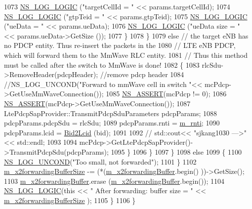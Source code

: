 \begin{DoxyCode}
1073             \hyperlink{group__logging_ga88acd260151caf2db9c0fc84997f45ce}{NS\_LOG\_LOGIC} (\textcolor{stringliteral}{"targetCellId = "} << params.targetCellId);
1074             \hyperlink{group__logging_ga88acd260151caf2db9c0fc84997f45ce}{NS\_LOG\_LOGIC} (\textcolor{stringliteral}{"gtpTeid = "} << params.gtpTeid);
1075             \hyperlink{group__logging_ga88acd260151caf2db9c0fc84997f45ce}{NS\_LOG\_LOGIC} (\textcolor{stringliteral}{"ueData = "} << params.ueData);
1076             \hyperlink{group__logging_ga88acd260151caf2db9c0fc84997f45ce}{NS\_LOG\_LOGIC} (\textcolor{stringliteral}{"ueData size = "} << params.ueData->GetSize ());
1077           \}
1078         \}
1079         \textcolor{keywordflow}{else} \textcolor{comment}{// the target eNB has no PDCP entity. Thus re-insert the packets in the }
1080         \textcolor{comment}{// LTE eNB PDCP, which will forward them to the MmWave RLC entity. }
1081         \textcolor{comment}{// Thus this method must be called after the switch to MmWave is done!}
1082         \{
1083           rlcSdu->RemoveHeader(pdcpHeader); \textcolor{comment}{//remove pdcp header}
1084           \textcolor{comment}{//NS\_LOG\_UNCOND("Forward to mmWave cell in switch  "<< mcPdcp->GetUseMmWaveConnection());}
1085           \hyperlink{assert_8h_a6dccdb0de9b252f60088ce281c49d052}{NS\_ASSERT}(mcPdcp != 0);
1086           \hyperlink{assert_8h_a6dccdb0de9b252f60088ce281c49d052}{NS\_ASSERT}(mcPdcp->GetUseMmWaveConnection());
1087           LtePdcpSapProvider::TransmitPdcpSduParameters pdcpParams;
1088           pdcpParams.pdcpSdu = rlcSdu;
1089           pdcpParams.rnti = \hyperlink{classns3_1_1UeManager_a5a72b4fe818f21993bd7f05d7e2c4f83}{m\_rnti};
1090           pdcpParams.lcid = \hyperlink{classns3_1_1UeManager_a5f3f8e891803bc57dc35af2c6c5a286d}{Bid2Lcid} (bid);
1091 
1092     \textcolor{comment}{//      std::cout<< "sjkang1030 --->" << std::endl;}
1093 
1094           mcPdcp->GetLtePdcpSapProvider()->TransmitPdcpSdu(pdcpParams);
1095         \}
1096       \}
1097     \}
1098     \textcolor{keywordflow}{else}
1099     \{
1100       \hyperlink{log-macros-disabled_8h_a0b36e5e182b37194f85ef1c5e979fb2e}{NS\_LOG\_UNCOND}(\textcolor{stringliteral}{"Too small, not forwarded"});
1101     \}
1102     \hyperlink{classns3_1_1UeManager_af9b888fa844a79c14b46c50ebae65031}{m\_x2forwardingBufferSize} -= (*(\hyperlink{classns3_1_1UeManager_a3fb8a9dc6ef434306f90f42837f3ae83}{m\_x2forwardingBuffer}.begin()
      ))->GetSize();
1103     \hyperlink{classns3_1_1UeManager_a3fb8a9dc6ef434306f90f42837f3ae83}{m\_x2forwardingBuffer}.erase (\hyperlink{classns3_1_1UeManager_a3fb8a9dc6ef434306f90f42837f3ae83}{m\_x2forwardingBuffer}.begin());
1104     \hyperlink{group__logging_ga88acd260151caf2db9c0fc84997f45ce}{NS\_LOG\_LOGIC}(\textcolor{keyword}{this} << \textcolor{stringliteral}{" After forwarding: buffer size = "} << 
      \hyperlink{classns3_1_1UeManager_af9b888fa844a79c14b46c50ebae65031}{m\_x2forwardingBufferSize} );
1105   \}
1106 \}
\end{DoxyCode}


